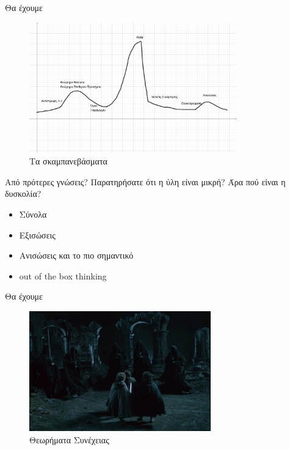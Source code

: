 \documentclass[greek]{beamer}
\begin{document}
\begin{frame}{Θα έχουμε}
      \begin{figure}
            \centering
            \includegraphics[width=0.8\textwidth]{"images/difficulty"}
            \caption{Τα σκαμπανεβάσματα}
      \end{figure}
\end{frame}

\begin{frame}{Από πρότερες γνώσεις?}
      Παρατηρήσατε ότι η ύλη είναι μικρή? Άρα πού είναι η δυσκολία?
      \begin{itemize}
            \item Σύνολα
            \item Εξισώσεις
            \item Ανισώσεις \pause και το πιο σημαντικό \pause
            \item out of the box thinking
      \end{itemize}
\end{frame}

\begin{frame}{Θα έχουμε}
      \begin{figure}
            \centering
            \includegraphics[width=0.7\textwidth]{"images/weathertop"}
            \caption{Θεωρήματα Συνέχειας}
      \end{figure}
\end{frame}
\end{document}
